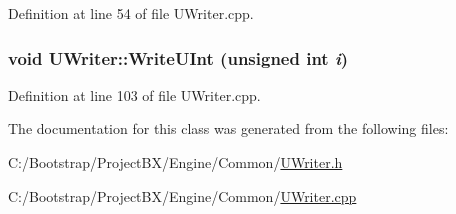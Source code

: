 Definition at line 54 of file UWriter.cpp.\hypertarget{class_u_writer_a1f6d44d3988a40cc188ab237c5edc0a}{
\subsubsection[{WriteUInt}]{\setlength{\rightskip}{0pt plus 5cm}void UWriter::WriteUInt (unsigned int {\em i})}}
\label{class_u_writer_a1f6d44d3988a40cc188ab237c5edc0a}




Definition at line 103 of file UWriter.cpp.

The documentation for this class was generated from the following files:\begin{CompactItemize}
\item 
C:/Bootstrap/ProjectBX/Engine/Common/\hyperlink{_u_writer_8h}{UWriter.h}\item 
C:/Bootstrap/ProjectBX/Engine/Common/\hyperlink{_u_writer_8cpp}{UWriter.cpp}\end{CompactItemize}
